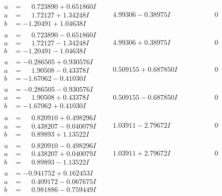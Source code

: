 \documentclass[1p]{elsarticle_modified}
\theoremstyle{definition}
\begin{document}
$$\begin{array}{c|c|c}
\begin{aligned}
u &= \phantom{-}0.723890 + 0.651860 I \\
a &= \phantom{-}1.72127 + 1.34248 I \\
b &= -1.20491 + 1.04638 I\end{aligned}
 & \phantom{-}4.99306 - 0.38975 I & \phantom{-0.000000 } 0 \\ \hline\begin{aligned}
u &= \phantom{-}0.723890 - 0.651860 I \\
a &= \phantom{-}1.72127 - 1.34248 I \\
b &= -1.20491 - 1.04638 I\end{aligned}
 & \phantom{-}4.99306 + 0.38975 I & \phantom{-0.000000 } 0 \\ \hline\begin{aligned}
u &= -0.286505 + 0.930576 I \\
a &= \phantom{-}1.90508 - 0.43378 I \\
b &= -1.67062 - 0.41030 I\end{aligned}
 & \phantom{-}0.509155 + 0.687850 I & \phantom{-0.000000 } 0 \\ \hline\begin{aligned}
u &= -0.286505 - 0.930576 I \\
a &= \phantom{-}1.90508 + 0.43378 I \\
b &= -1.67062 + 0.41030 I\end{aligned}
 & \phantom{-}0.509155 - 0.687850 I & \phantom{-0.000000 } 0 \\ \hline\begin{aligned}
u &= \phantom{-}0.820910 + 0.498296 I \\
a &= \phantom{-}0.438207 - 0.040079 I \\
b &= \phantom{-}0.89893 + 1.13522 I\end{aligned}
 & \phantom{-}1.03911 - 2.79672 I & \phantom{-0.000000 } 0 \\ \hline\begin{aligned}
u &= \phantom{-}0.820910 - 0.498296 I \\
a &= \phantom{-}0.438207 + 0.040079 I \\
b &= \phantom{-}0.89893 - 1.13522 I\end{aligned}
 & \phantom{-}1.03911 + 2.79672 I & \phantom{-0.000000 } 0 \\ \hline\begin{aligned}
u &= -0.941752 + 0.162453 I \\
a &= \phantom{-}0.409172 - 0.067675 I \\
b &= \phantom{-}0.981886 - 0.759449 I\end{aligned}

\end{array}$$
\end{document}
